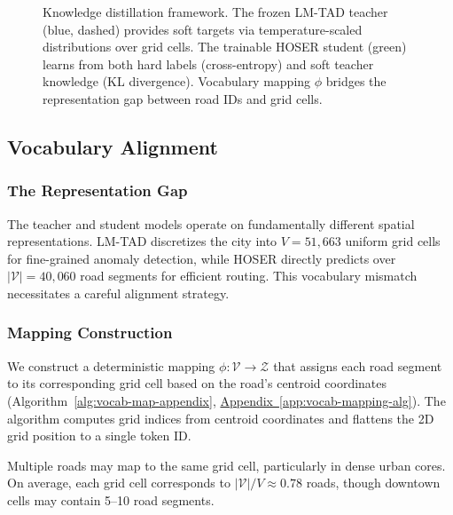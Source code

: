 \begin{figure}[t]
\caption{Knowledge distillation framework. The frozen LM-TAD teacher (blue, dashed) provides soft targets via temperature-scaled distributions over grid cells. The trainable HOSER student (green) learns from both hard labels (cross-entropy) and soft teacher knowledge (KL divergence). Vocabulary mapping $\phi$ bridges the representation gap between road IDs and grid cells.}
\label{fig:distillation-framework}
\end{figure}

\subsection{Vocabulary Alignment}
\label{sec:method-vocab}

\subsubsection{The Representation Gap}
The teacher and student models operate on fundamentally different spatial representations. LM-TAD discretizes the city into $V = 51{,}663$ uniform grid cells for fine-grained anomaly detection, while HOSER directly predicts over $|\mathcal{V}| = 40{,}060$ road segments for efficient routing. This vocabulary mismatch necessitates a careful alignment strategy.

\subsubsection{Mapping Construction}
We construct a deterministic mapping $\phi: \mathcal{V} \rightarrow \mathcal{Z}$ that assigns each road segment to its corresponding grid cell based on the road's centroid coordinates (Algorithm~\ref{alg:vocab-map-appendix}, \hyperref[app:vocab-mapping-alg]{Appendix~\ref*{app:vocab-mapping-alg}}). The algorithm computes grid indices from centroid coordinates and flattens the 2D grid position to a single token ID.

\begin{remark}
Multiple roads may map to the same grid cell, particularly in dense urban cores. On average, each grid cell corresponds to $|\mathcal{V}|/V \approx 0.78$ roads, though downtown cells may contain 5--10 road segments.
\end{remark}

